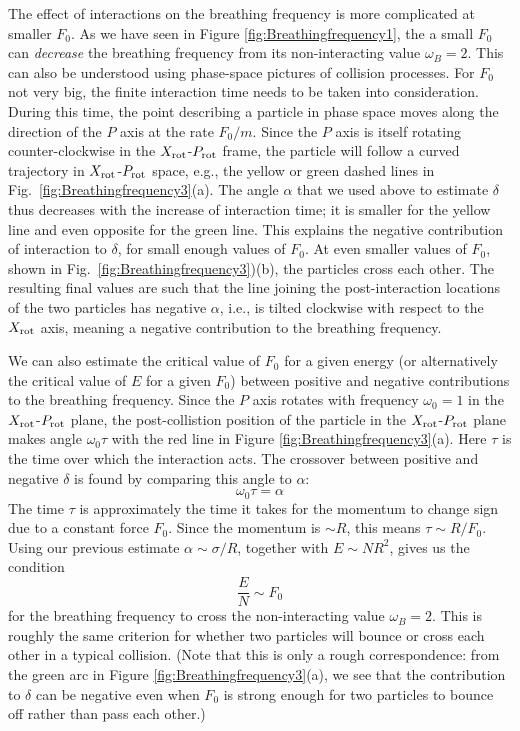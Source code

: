 \documentclass[a4paper, onecolumn]{revtex4-1}
\begin{document}
The effect of interactions on the breathing frequency is more complicated at smaller $F_0$.  As we
have seen in Figure \ref{fig:Breathingfrequency1}, the a small $F_0$ can \emph{decrease} the
breathing frequency from its non-interacting value $\omega_B=2$.  This can also be understood using
phase-space pictures of collision processes.  For $F_0$ not very big, the finite interaction time
needs to be taken into consideration.  During this time, the point describing a particle in phase
space moves along the direction of the $P$ axis at the rate $F_0/m$.  Since the $P$ axis is itself
rotating counter-clockwise in the $X_{\rm rot}$-$P_{\rm rot}$ frame, the particle will follow a
curved trajectory in $X_{\rm rot}$-$P_{\rm rot}$ space, e.g., the yellow or green dashed lines in
Fig.~\ref{fig:Breathingfrequency3}(a).  The angle $\alpha$ that we used above to estimate $\delta$
thus decreases with the increase of interaction time; it is smaller for the yellow line and even
opposite for the green line.  This explains the negative contribution of interaction to $\delta$,
for small enough values of $F_0$.  At even smaller values of $F_0$, shown in
Fig.~\ref{fig:Breathingfrequency3})(b), the particles cross each other.  The resulting final values
are such that the line joining the post-interaction locations of the two particles has negative
$\alpha$, i.e., is tilted clockwise with respect to the $X_{\rm rot}$ axis, meaning a negative
contribution to the breathing frequency.

We can also estimate the critical value of $F_0$ for a given energy (or alternatively the critical
value of $E$ for a given $F_0$) between positive and negative contributions to the breathing
frequency.  Since the $P$ axis rotates with frequency $\omega_0=1$ in the $X_{\rm rot}$-$P_{\rm
  rot}$ plane, the post-collistion position of the particle in the $X_{\rm rot}$-$P_{\rm rot}$ plane
makes angle $\omega_0\tau$ with the red line in Figure \ref{fig:Breathingfrequency3}(a).  Here
$\tau$ is the time over which the interaction acts.  The crossover between positive and negative
$\delta$ is found by comparing this angle to $\alpha$:
\begin{equation}
\omega_0 \tau=\alpha
\end{equation}
The time $\tau$ is approximately the time it takes for the momentum to change sign due to a constant
force $F_0$.  Since the momentum is $\sim R$, this means $\tau\sim R/F_0$.  Using our previous
estimate  $\alpha\sim \sigma/R$, together with $E\sim NR^2$, gives us the condition
\begin{equation}
  \frac{E}{N} \sim F_0
  \label{eq_freq_turning_condition}
\end{equation}
for the breathing frequency to cross the non-interacting value $\omega_B=2$.  This is roughly the
same criterion for whether two particles will bounce or cross each other in a typical collision.
(Note that this is only a rough correspondence: from the green arc in Figure
\ref{fig:Breathingfrequency3}(a), we see that the contribution to $\delta$ can be negative even when
$F_0$ is strong enough for two particles to bounce off rather than pass each other.)
\end{document}
